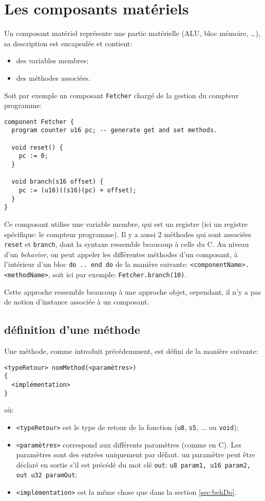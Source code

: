 \section{Les composants matériels}
\label{sec:component}
Un composant matériel représente une partie matérielle (ALU, bloc mémoire, \ldots), sa description est encapsulée et contient:
\begin{itemize}
\item des variables membres;
\item des méthodes associées.
\end{itemize}
Soit par exemple un composant \texttt{Fetcher} chargé de la gestion du compteur programme:
\begin{lstlisting}
component Fetcher {
  program counter u16 pc; -- generate get and set methods.

  void reset() {
    pc := 0;
  }

  void branch(s16 offset) {
    pc := (u16)((s16)(pc) + offset);
  }
}
\end{lstlisting}
Ce composant utilise une variable membre, qui est un registre (ici un registre spécifique: le compteur programme). Il y a aussi 2 méthodes qui sont associées \texttt{reset} et \texttt{branch}, dont la syntaxe ressemble beaucoup à celle du C. Au niveau d'un \emph{behavior}, on peut appeler les différentes méthodes d'un composant, à l'intérieur d'un bloc \texttt{do .. end do} de la manière suivante: \texttt{<componentName>.<methodName>}, soit ici par exemple: \texttt{Fetcher.branch(10)}. 

Cette approche ressemble beaucoup à une approche objet, cependant, il n'y a pas de notion d'instance associée à un composant.
\subsection{définition d'une méthode}
Une méthode, comme introduit précédemment, est défini de la manière suivante:
\begin{verbatim}
<typeRetour> nomMethod(<paramètres>)
{
  <implémentation>
}
\end{verbatim}
où:
\begin{itemize}
\item \texttt{<typeRetour>} est le type de retour de la fonction (\texttt{u8}, \texttt{s5}, ... ou \texttt{void});
\item \texttt{<paramètres>} correspond aux différents paramètres (comme en C). Les paramètres sont des entrées uniquement par défaut. un paramètre peut être déclaré en sortie s'il est précédé du mot clé \texttt{out}: \texttt{u8 param1, u16 param2, out u32 paramOut};
\item \texttt{<implémentation>} est la même chose que dans la section \ref{sec:behDo}.
\end{itemize}

